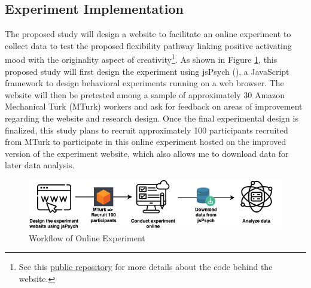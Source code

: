 \documentclass[../Proposal.tex]{subfiles}
\begin{document}
\subsection*{Experiment Implementation}
The proposed study will design a website to facilitate an online experiment to collect data to test the proposed flexibility pathway linking positive activating mood with the originality aspect of creativity\footnote{See this \href{https://github.com/cty20010831/incomplete_drawing_task}{public repository} for more details about the code behind the website.}. As shown in Figure \ref{fig: Workflow of Online Experiment}, this proposed study will first design the experiment using jsPsych (\cite{leeuw_jspsych_2023}), a JavaScript framework to design behavioral experiments running on a web browser. The website will then be pretested among a sample of approximately 30 Amazon Mechanical Turk (MTurk) workers and ask for feedback on areas of improvement regarding the website and research design. Once the final experimental design is finalized, this study plans to recruit approximately 100 participants recruited from MTurk to participate in this online experiment hosted on the improved version of the experiment website, which also allows me to download data for later data analysis.

\begin{figure}
    \centering
    \includegraphics[width=0.8\linewidth, keepaspectratio]{drawio/Workflow.png}
    \caption{Workflow of Online Experiment}
    \label{fig: Workflow of Online Experiment}
\end{figure}
\end{document}
